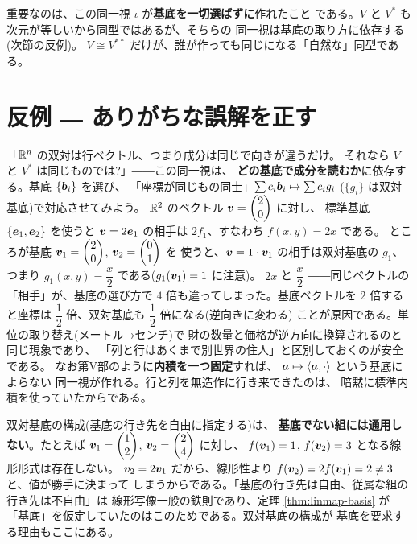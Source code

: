 重要なのは、この同一視 $\iota$ が\textbf{基底を一切選ばずに}作れたこと
である。$V$ と $V^{*}$ も次元が等しいから同型ではあるが、そちらの
同一視は基底の取り方に依存する(次節の反例)。
$V \cong V^{**}$ だけが、誰が作っても同じになる「自然な」同型である。

\section{反例 ― ありがちな誤解を正す}

\begin{hanrei}[ベクトルと線形形式の同一視は基底に依存する]\label{hanrei:dual-ident}
「$\mathbb{R}^n$ の双対は行ベクトル、つまり成分は同じで向きが違うだけ。
それなら $V$ と $V^{*}$ は同じものでは?」――この同一視は、
\textbf{どの基底で成分を読むか}に依存する。基底 $\{\bm{b}_i\}$ を選び、
「座標が同じもの同士」$\sum c_i \bm{b}_i \mapsto \sum c_i g_i$
($\{g_i\}$ は双対基底)で対応させてみよう。
$\mathbb{R}^2$ のベクトル $\bm{v} = \begin{pmatrix}2 \\ 0\end{pmatrix}$ に対し、
標準基底 $\{\bm{e}_1, \bm{e}_2\}$ を使うと
$\bm{v} = 2\bm{e}_1$ の相手は $2f_1$、すなわち $f(x, y) = 2x$ である。
ところが基底 $\bm{v}_1 = \begin{pmatrix}2 \\ 0\end{pmatrix}$, $\bm{v}_2 = \begin{pmatrix}0 \\ 1\end{pmatrix}$ を
使うと、$\bm{v} = 1 \cdot \bm{v}_1$ の相手は双対基底の $g_1$、
つまり $g_1(x, y) = \dfrac{x}{2}$ である($g_1(\bm{v}_1) = 1$ に注意)。
$2x$ と $\dfrac{x}{2}$ ――同じベクトルの「相手」が、基底の選び方で
$4$ 倍も違ってしまった。基底ベクトルを $2$ 倍すると座標は
$\dfrac{1}{2}$ 倍、双対基底も $\dfrac{1}{2}$ 倍になる(逆向きに変わる)
ことが原因である。単位の取り替え(メートル→センチ)で
財の数量と価格が逆方向に換算されるのと同じ現象であり、
「列と行はあくまで別世界の住人」と区別しておくのが安全である。
なお第V部のように\textbf{内積を一つ固定}すれば、
$\bm{a} \mapsto \langle \bm{a}, \cdot \rangle$ という基底によらない
同一視が作れる。行と列を無造作に行き来できたのは、
暗黙に標準内積を使っていたからである。
\end{hanrei}

\begin{hanrei}[線形従属な組には値を自由に指定できない]\label{hanrei:dual-dep}
双対基底の構成(基底の行き先を自由に指定する)は、
\textbf{基底でない組には通用しない}。たとえば
$\bm{v}_1 = \begin{pmatrix}1 \\ 2\end{pmatrix}$, $\bm{v}_2 = \begin{pmatrix}2 \\ 4\end{pmatrix}$ に対し、
$f(\bm{v}_1) = 1$, $f(\bm{v}_2) = 3$ となる線形形式は存在しない。
$\bm{v}_2 = 2\bm{v}_1$ だから、線形性より
$f(\bm{v}_2) = 2f(\bm{v}_1) = 2 \neq 3$ と、値が勝手に決まって
しまうからである。「基底の行き先は自由、従属な組の行き先は不自由」は
線形写像一般の鉄則であり、定理 \ref{thm:linmap-basis} が
「基底」を仮定していたのはこのためである。双対基底の構成が
基底を要求する理由もここにある。
\end{hanrei}

